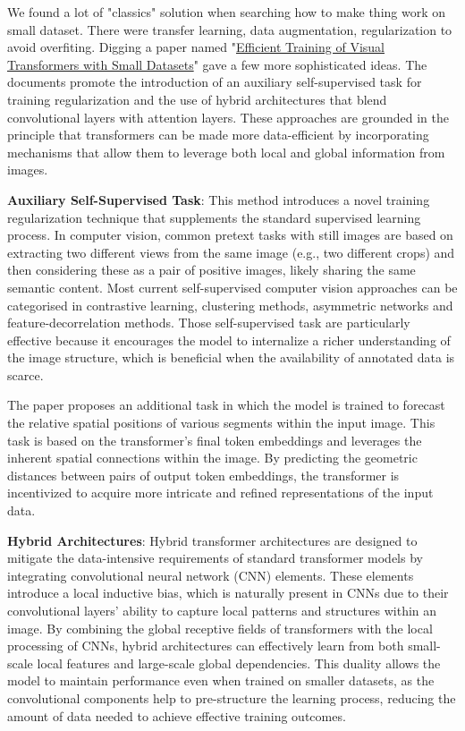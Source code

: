 We found a lot of "classics" solution when searching how to make thing work on small dataset. There were transfer learning, data augmentation, regularization to avoid overfiting. 
Digging a paper named "\href{https://arxiv.org/abs/2106.03746}{Efficient Training of Visual Transformers with Small Datasets}" gave a few more sophisticated ideas. The documents promote the introduction of an auxiliary self-supervised task for training regularization and the use of hybrid architectures that blend convolutional layers with attention layers. These approaches are grounded in the principle that transformers can be made more data-efficient by incorporating mechanisms that allow them to leverage both local and global information from images.

\textbf{Auxiliary Self-Supervised Task}: This method introduces a novel training regularization technique that supplements the standard supervised learning process. In computer vision, common pretext tasks with still images are based on extracting two different views from the same image (e.g., two different crops) and then considering these as a pair of positive images, likely sharing the same semantic content. Most current self-supervised computer
vision approaches can be categorised in contrastive learning, clustering methods, asymmetric networks and feature-decorrelation methods. Those self-supervised task are particularly effective because it encourages the model to internalize a richer understanding of the image structure, which is beneficial when the availability of annotated data is scarce.

The paper proposes an additional task in which the model is trained to forecast the relative spatial positions of various segments within the input image. This task is based on the transformer's final token embeddings and leverages the inherent spatial connections within the image. By predicting the geometric distances between pairs of output token embeddings, the transformer is incentivized to acquire more intricate and refined representations of the input data.

\textbf{Hybrid Architectures}: Hybrid transformer architectures are designed to mitigate the data-intensive requirements of standard transformer models by integrating convolutional neural network (CNN) elements. These elements introduce a local inductive bias, which is naturally present in CNNs due to their convolutional layers' ability to capture local patterns and structures within an image. By combining the global receptive fields of transformers with the local processing of CNNs, hybrid architectures can effectively learn from both small-scale local features and large-scale global dependencies. This duality allows the model to maintain performance even when trained on smaller datasets, as the convolutional components help to pre-structure the learning process, reducing the amount of data needed to achieve effective training outcomes.


